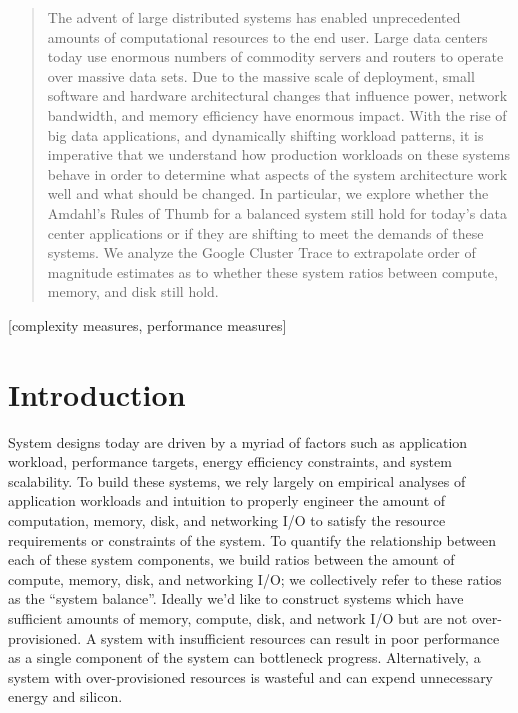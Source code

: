 \documentclass{sig-alternate}
\begin{document}
\maketitle
\begin{abstract}

The advent of large distributed systems has enabled unprecedented amounts of computational resources to the end user.
Large data centers today use enormous numbers of commodity servers and routers to operate over massive data sets.
Due to the massive scale of deployment, small software and hardware architectural changes that influence power, network bandwidth, and memory efficiency have enormous impact.
With the rise of big data applications, and dynamically shifting workload patterns, it is imperative that we understand how production workloads on these systems behave in order to determine what aspects of the system architecture work well and what should be changed.
In particular, we explore whether the Amdahl's Rules of Thumb for a balanced system still hold for today's data center applications or if they are shifting to meet the demands of these systems.
We analyze the Google Cluster Trace to extrapolate order of magnitude estimates as to whether these system ratios between compute, memory, and disk still hold.

\end{abstract}

[complexity measures, performance measures]



\section{Introduction}

System designs today are driven by a myriad of factors such as application workload, performance targets, energy efficiency constraints, and system scalability.
To build these systems, we rely largely on empirical analyses of application workloads and intuition to properly engineer the amount of computation, memory, disk, and networking I/O to satisfy the resource requirements or constraints of the system.
To quantify the relationship between each of these system components, we build ratios between the amount of compute, memory, disk, and networking I/O; we collectively refer to these ratios as the ``system balance''.
Ideally we'd like to construct systems which have sufficient amounts of memory, compute, disk, and network I/O but are not over-provisioned.
A system with insufficient resources can result in poor performance as a single component of the system can bottleneck progress.
Alternatively, a system with over-provisioned resources is wasteful and can expend unnecessary energy and silicon.
\end{document}
